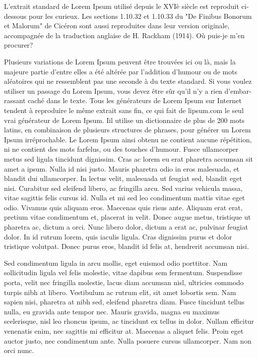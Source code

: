 L'extrait standard de Lorem Ipsum utilisé depuis le XVIè siècle est reproduit ci-dessous pour les curieux. Les sections 1.10.32 et 1.10.33 du "De Finibus Bonorum et Malorum" de Cicéron sont aussi reproduites dans leur version originale, accompagnée de la traduction anglaise de H. Rackham (1914).
Où puis-je m'en procurer?

Plusieurs variations de Lorem Ipsum peuvent être trouvées ici ou là, mais la majeure partie d'entre elles a été altérée par l'addition d'humour ou de mots aléatoires qui ne ressemblent pas une seconde à du texte standard. Si vous voulez utiliser un passage du Lorem Ipsum, vous devez être sûr qu'il n'y a rien d'embar-rassant caché dans le texte. Tous les générateurs de Lorem Ipsum sur Internet tendent à reproduire le même extrait sans fin, ce qui fait de lipsum.com le seul vrai générateur de Lorem Ipsum. Iil utilise un dictionnaire de plus de 200 mots latins, en combinaison de plusieurs structures de phrases, pour générer un Lorem Ipsum irréprochable. Le Lorem Ipsum ainsi obtenu ne contient aucune répétition, ni ne contient des mots farfelus, ou des touches d'humour.
 Fusce ullamcorper metus sed ligula tincidunt dignissim. Cras ac lorem eu erat pharetra accumsan sit amet a ipsum. Nulla id nisi justo. Mauris pharetra odio in eros malesuada, et blandit dui ullamcorper. In lectus velit, malesuada ut feugiat sed, blandit eget nisi. Curabitur sed eleifend libero, ac fringilla arcu. Sed varius vehicula massa, vitae sagittis felis cursus id. Nulla et mi sed leo condimentum mattis vitae eget odio. Vivamus quis aliquam eros. Maecenas quis risus ante. Aliquam erat erat, pretium vitae condimentum et, placerat in velit. Donec augue metus, tristique ut pharetra ac, dictum a orci. Nunc libero dolor, dictum a erat ac, pulvinar feugiat dolor. In id rutrum lorem, quis iaculis ligula. Cras dignissim purus et dolor tristique volutpat. Donec purus eros, blandit id felis at, hendrerit accumsan nisi.

Sed condimentum ligula in arcu mollis, eget euismod odio porttitor. Nam sollicitudin ligula vel felis molestie, vitae dapibus sem fermentum. Suspendisse porta, velit nec fringilla molestie, lacus diam accumsan nisl, ultricies commodo turpis nibh at libero. Vestibulum ac rutrum elit, sit amet lobortis sem. Nam sapien nisi, pharetra at nibh sed, eleifend pharetra diam. Fusce tincidunt tellus nulla, eu gravida ante tempor nec. Mauris gravida, magna eu maximus scelerisque, nisl leo rhoncus ipsum, ac tincidunt ex tellus in dolor. Nullam efficitur venenatis enim, nec sagittis mi efficitur at. Maecenas a aliquet felis. Proin eget auctor justo, nec condimentum ante. Nulla posuere cursus ullamcorper. Nam non orci nunc.

